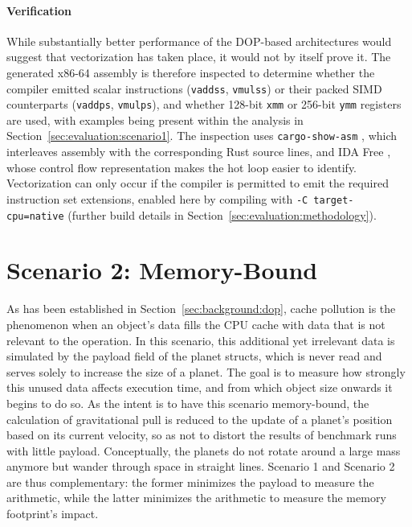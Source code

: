 \paragraph{Verification}
While substantially better performance of the \ac{DOP}-based architectures would suggest that vectorization has taken place, it would not by itself prove it. The generated x86-64 assembly is therefore inspected to determine whether the compiler emitted scalar instructions (\texttt{vaddss}, \texttt{vmulss}) or their packed \ac{SIMD} counterparts (\texttt{vaddps}, \texttt{vmulps}), and whether \num{128}-bit \texttt{xmm} or \num{256}-bit \texttt{ymm} registers are used, with examples being present within the analysis in Section~\ref{sec:evaluation:scenario1}. The inspection uses \texttt{cargo-show-asm} \cite{cargo_show_asm}, which interleaves assembly with the corresponding Rust source lines, and IDA Free \cite{ida_free}, whose control flow representation makes the hot loop easier to identify. Vectorization can only occur if the compiler is permitted to emit the required instruction set extensions, enabled here by compiling with \mbox{\texttt{-C~target-cpu=native}} (further build details in Section~\ref{sec:evaluation:methodology}).
    
\section{Scenario 2: Memory-Bound}
\label{sec:benchmarks:scenario2}
As has been established in Section~\ref{sec:background:dop}, cache pollution is the phenomenon when an object's data fills the CPU cache with data that is not relevant to the operation. In this scenario, this additional yet irrelevant data is simulated by the payload field of the planet structs, which is never read and serves solely to increase the size of a planet. The goal is to measure how strongly this unused data affects execution time, and from which object size onwards it begins to do so. As the intent is to have this scenario memory-bound, the calculation of gravitational pull is reduced to the update of a planet's position based on its current velocity, so as not to distort the results of benchmark runs with little payload. Conceptually, the planets do not rotate around a large mass anymore but wander through space in straight lines. Scenario 1 and Scenario 2 are thus complementary: the former minimizes the payload to measure the arithmetic, while the latter minimizes the arithmetic to measure the memory footprint's impact. 

